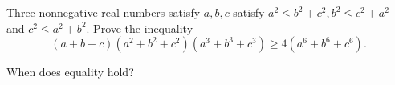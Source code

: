 Three nonnegative real numbers satisfy $a,b,c$ satisfy $a^2\le b^2+c^2, b^2\le c^2+a^2$ and $c^2\le a^2+b^2$. Prove the inequality\[(a+b+c)(a^2+b^2+c^2)(a^3+b^3+c^3)\ge 4(a^6+b^6+c^6).\]

When does equality hold?